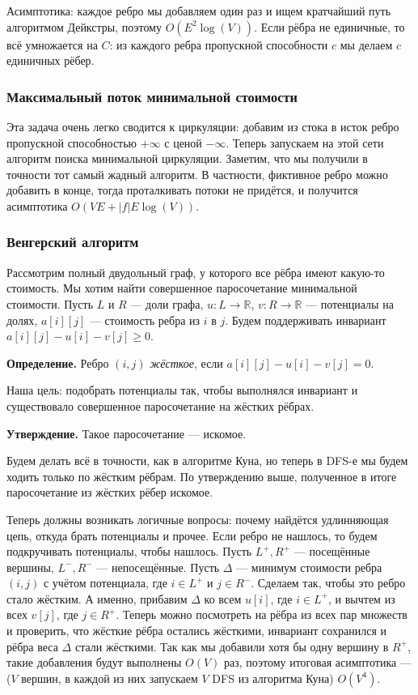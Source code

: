 Асимптотика: каждое ребро мы добавляем один раз и ищем кратчайший путь алгоритмом Дейкстры, поэтому $O(E^2 \log(V))$.
Если рёбра не единичные, то всё умножается на $C$: из каждого ребра пропускной способности $c$ мы делаем $c$ единичных рёбер.

\subsubsection{Максимальный поток минимальной стоимости}
Эта задача очень легко сводится к циркуляции: добавим из стока в исток ребро пропускной способностью $+\infty$ с ценой $-\infty$.
Теперь запускаем на этой сети алгоритм поиска минимальной циркуляции.
Заметим, что мы получили в точности тот самый жадный алгоритм.
В частности, фиктивное ребро можно добавить в конце, тогда проталкивать потоки не придётся, и получится асимптотика $O(VE + |f| E \log(V))$.

\subsubsection{Венгерский алгоритм}
Рассмотрим полный двудольный граф, у которого все рёбра имеют какую-то стоимость.
Мы хотим найти совершенное паросочетание минимальной стоимости.
Пусть $L$ и $R$ --- доли графа, $u: L \to \mathbb R$, $v: R \to \mathbb R$ --- потенциалы на долях, $a[i][j]$ --- стоимость ребра из $i$ в $j$.
Будем поддерживать инвариант $a[i][j] - u[i] - v[j] \ge 0$.

\textbf{Определение.} Ребро $(i, j)$ \textit{жёсткое}, если $a[i][j] - u[i] - v[j] = 0$.

Наша цель: подобрать потенциалы так, чтобы выполнялся инвариант и существовало совершенное паросочетание на жёстких рёбрах.

\textbf{Утверждение.} Такое паросочетание --- искомое.

Будем делать всё в точности, как в алгоритме Куна, но теперь в DFS-е мы будем ходить только по жёстким рёбрам.
По утверждению выше, полученное в итоге паросочетание из жёстких рёбер искомое.

Теперь должны возникать логичные вопросы: почему найдётся удлинняющая цепь, откуда брать потенциалы и прочее.
Если ребро не нашлось, то будем подкручивать потенциалы, чтобы нашлось.
Пусть $L^+, R^+$ --- посещённые вершины, $L^-, R^-$ --- непосещённые.
Пусть $\Delta$ --- минимум стоимости ребра $(i, j)$ с учётом потенциала, где $i \in L^+$ и $j \in R^-$.
Сделаем так, чтобы это ребро стало жёстким. А именно, прибавим $\Delta$ ко всем $u[i]$, где $i \in L^+$, и вычтем из всех $v[j]$, где $j \in R^+$.
Теперь можно посмотреть на рёбра из всех пар множеств и проверить, что жёсткие рёбра остались жёсткими, инвариант сохранился и рёбра веса $\Delta$ стали жёсткими.
Так как мы добавили хотя бы одну вершину в $R^+$, такие добавления будут выполнены $O(V)$ раз, поэтому итоговая асимптотика --- ($V$ вершин, в каждой из них запускаем $V$ DFS из алгоритма Куна) $O(V^4)$.


